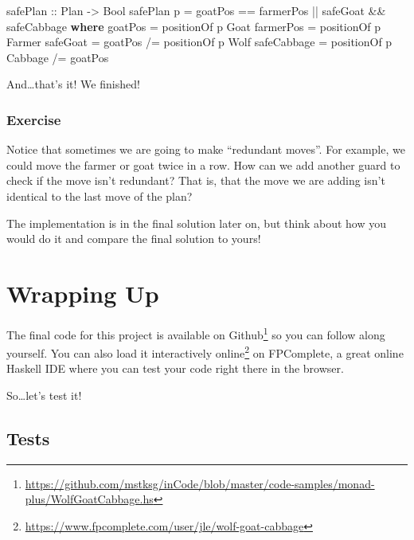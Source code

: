 \documentclass[]{article}
\newenvironment{Shaded}{}{}
\newcommand{\KeywordTok}[1]{\textcolor[rgb]{0.00,0.44,0.13}{\textbf{{#1}}}}
\newcommand{\DataTypeTok}[1]{\textcolor[rgb]{0.56,0.13,0.00}{{#1}}}
\newcommand{\OtherTok}[1]{\textcolor[rgb]{0.00,0.44,0.13}{{#1}}}
\newcommand{\FunctionTok}[1]{\textcolor[rgb]{0.02,0.16,0.49}{{#1}}}
\newcommand{\NormalTok}[1]{{#1}}
\renewcommand{\href}[2]{#2\footnote{\url{#1}}}
\begin{document}
\begin{Shaded}
\begin{Highlighting}[]
\OtherTok{safePlan ::} \DataTypeTok{Plan} \OtherTok{->} \DataTypeTok{Bool}
\NormalTok{safePlan p }\FunctionTok{=} \NormalTok{goatPos }\FunctionTok{==} \NormalTok{farmerPos }\FunctionTok{||} \NormalTok{safeGoat }\FunctionTok{&&} \NormalTok{safeCabbage}
    \KeywordTok{where}
        \NormalTok{goatPos     }\FunctionTok{=} \NormalTok{positionOf p }\DataTypeTok{Goat}
        \NormalTok{farmerPos   }\FunctionTok{=} \NormalTok{positionOf p }\DataTypeTok{Farmer}
        \NormalTok{safeGoat    }\FunctionTok{=} \NormalTok{goatPos }\FunctionTok{/=} \NormalTok{positionOf p }\DataTypeTok{Wolf}
        \NormalTok{safeCabbage }\FunctionTok{=} \NormalTok{positionOf p }\DataTypeTok{Cabbage} \FunctionTok{/=} \NormalTok{goatPos}
\end{Highlighting}
\end{Shaded}

And\ldots{}that's it! We finished!

\subsubsection{Exercise}\label{exercise}

Notice that sometimes we are going to make ``redundant moves''. For example, we
could move the farmer or goat twice in a row. How can we add another guard to
check if the move isn't redundant? That is, that the move we are adding isn't
identical to the last move of the plan?

The implementation is in the final solution later on, but think about how you
would do it and compare the final solution to yours!

\section{Wrapping Up}\label{wrapping-up}

The final code for this project is available
\href{https://github.com/mstksg/inCode/blob/master/code-samples/monad-plus/WolfGoatCabbage.hs}{on
Github} so you can follow along yourself. You can also
\href{https://www.fpcomplete.com/user/jle/wolf-goat-cabbage}{load it
interactively online} on FPComplete, a great online Haskell IDE where you can
test your code right there in the browser.

So\ldots{}let's test it!

\subsection{Tests}\label{tests}
\end{document}
